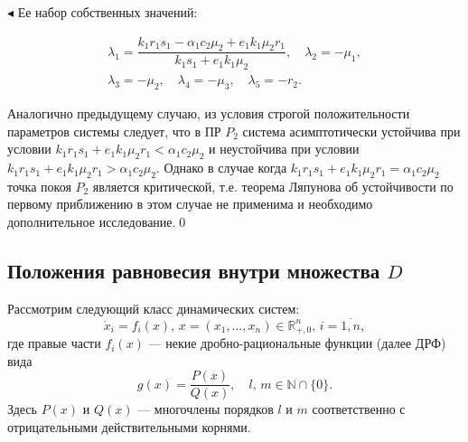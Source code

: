 \documentclass[12pt,a4paper]{extarticle}
\renewenvironment{proof}{\noindent$\blacktriangleleft$}{}
\theoremstyle{definition}
\theoremstyle{definition}
\theoremstyle{definition}
\begin{document}
\begin{proof}
		Ее набор собственных значений:
		
		\begin{multline*}
		\lambda_1=\dfrac{k_1r_1s_1 - \alpha_1c_2\mu_2 + e_1k_1\mu_2r_1}{k_1s_1 + e_1k_1\mu_2},\quad \lambda_2=-\mu_1,\\
		\lambda_3=-\mu_2,\quad \lambda_4=-\mu_3,\quad \lambda_5=-r_2.
		\end{multline*}
		
		Аналогично предыдущему случаю, из условия строгой положительности параметров системы следует, что в ПР $P_2$ система асимптотически устойчива при условии $k_1r_1s_1 + e_1k_1\mu_2r_1< \alpha_1c_2\mu_2$ и неустойчива при условии $k_1r_1s_1 + e_1k_1\mu_2r_1>\alpha_1c_2\mu_2$. Однако в случае когда $k_1r_1s_1 + e_1k_1\mu_2r_1=\alpha_1c_2\mu_2$ точка покоя $P_2$ является критической, т.е. теорема Ляпунова об устойчивости по первому приближению в этом случае не применима и необходимо дополнительное исследование.\qed
	\end{proof}
	
	\subsection{Положения равновесия внутри множества $D$}
	
	Рассмотрим следующий класс динамических систем:
	\[\dot{x}_i=f_i(x),\, x=(x_1,\dots,x_n)\in\mathbb{R}^{n}_{+,0},\, i=\overline{1,n},\]
	где правые части $f_i(x)$ --- некие дробно-рациональные функции (далее ДРФ) вида 
	\begin{equation*}
		g(x)=\dfrac{P(x)}{Q(x)},\quad l,\, m\in\mathbb{N}\cap\{0\}.
	\end{equation*}
	Здесь $P(x)$ и $Q(x)$ --- многочлены порядков $l$ и $m$ соответственно с отрицательными действительными корнями. 
	
\end{document}
